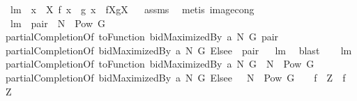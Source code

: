 \begin{isabellebody}
\isanewline
\isanewline
{}\isamarkupfalse%
\ lm{}{}{\isacharcolon}\ \ {\isachardoublequoteopen}{\isasymforall}x\ {\isasymin}\ X{\isachardot}\ f\ x\ {\isacharequal}\ g\ x{\isachardoublequoteclose}\ \ {\isachardoublequoteopen}f{\isacharbackquote}X{\isacharequal}g{\isacharbackquote}X{\isachardoublequoteclose}%
\isadelimproof
\ %
\endisadelimproof
%
\isatagproof
{}\isamarkupfalse%
\ assms\ \isamarkupfalse%
\ {\isacharparenleft}metis\ image{\isacharunderscore}cong{\isacharparenright}%
\endisatagproof
{\isafoldproof}%
%
\isadelimproof
%
\endisadelimproof
\isanewline
\isanewline
{}\isamarkupfalse%
\ lm{}{}{\isacharcolon}\ {\isachardoublequoteopen}{\isasymforall}\ pair\ {\isasymin}\ N\ {\isasymtimes}\ {\isacharparenleft}Pow\ G\ {\isacharminus}\ {\isacharbraceleft}{\isacharbraceleft}{\isacharbraceright}{\isacharbraceright}{\isacharparenright}{\isachardot}\ \ \isanewline
partialCompletionOf\ {\isacharparenleft}toFunction\ {\isacharparenleft}bidMaximizedBy\ a\ N\ G{\isacharparenright}{\isacharparenright}\ pair\ {\isacharequal}\ \isanewline
partialCompletionOf\ {\isacharparenleft}{\isacharparenleft}bidMaximizedBy\ a\ N\ G{\isacharparenright}\ Elsee\ {}{\isacharparenright}\ pair{\isachardoublequoteclose}%
\isadelimproof
\ %
\endisadelimproof
%
\isatagproof
{}\isamarkupfalse%
\ lm{}{}\ \isanewline
{}\isamarkupfalse%
\ blast%
\endisatagproof
{\isafoldproof}%
%
\isadelimproof
%
\endisadelimproof
\ \ \isanewline
\isanewline
{}\isamarkupfalse%
\ lm{}{}{\isacharcolon}\ \isanewline
{\isachardoublequoteopen}{\isacharparenleft}partialCompletionOf\ {\isacharparenleft}toFunction\ {\isacharparenleft}bidMaximizedBy\ a\ N\ G{\isacharparenright}{\isacharparenright}{\isacharparenright}\ {\isacharbackquote}\ {\isacharparenleft}N\ {\isasymtimes}\ {\isacharparenleft}Pow\ G\ {\isacharminus}\ {\isacharbraceleft}{\isacharbraceleft}{\isacharbraceright}{\isacharbraceright}{\isacharparenright}{\isacharparenright}{\isacharequal}\isanewline
{\isacharparenleft}partialCompletionOf\ {\isacharparenleft}{\isacharparenleft}bidMaximizedBy\ a\ N\ G{\isacharparenright}\ Elsee\ {}{\isacharparenright}{\isacharparenright}\ {\isacharbackquote}\ {\isacharparenleft}N\ {\isasymtimes}\ {\isacharparenleft}Pow\ G\ {\isacharminus}\ {\isacharbraceleft}{\isacharbraceleft}{\isacharbraceright}{\isacharbraceright}{\isacharparenright}{\isacharparenright}{\isachardoublequoteclose}\ {\isacharparenleft}\ {\isachardoublequoteopen}{\isacharquery}f{}\ {\isacharbackquote}\ {\isacharquery}Z\ {\isacharequal}\ {\isacharquery}f{}\ {\isacharbackquote}\ {\isacharquery}Z{\isachardoublequoteclose}{\isacharparenright}\isanewline

\end{isabellebody}
